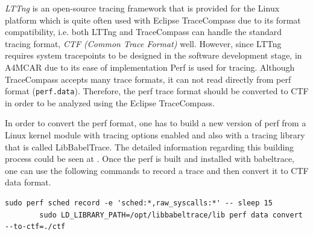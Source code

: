\begin{itemize}
	\textit{LTTng} \cite{lttng} is an open-source tracing framework that is provided for the Linux platform which is quite often used with Eclipse TraceCompass due to its format compatibility, i.e. both LTTng and TraceCompass can handle the standard tracing format, \textit{CTF (Common Trace Format)} well. However, since LTTng requires system tracepoints to be designed in the software development stage, in A4MCAR due to its ease of implementation Perf is used for tracing. Although TraceCompass accepts many trace formats, it can not read directly from perf format (\texttt{perf.data}). Therefore, the perf trace format should be converted to CTF in order to be analyzed using the Eclipse TraceCompass.
	
	In order to convert the perf format, one has to build a new version of perf from a Linux kernel module \cite{jolsa} with tracing options enabled and also with a tracing library that is called LibBabelTrace. The detailed information regarding this building process could be seen at \cite{perfbabeltrace}. Once the perf is built and installed with babeltrace, one can use the following commands to record a trace and then convert it to CTF data format. 
	\begin{lstlisting}[style=bash]
		sudo perf sched record -e 'sched:*,raw_syscalls:*' -- sleep 15
		sudo LD_LIBRARY_PATH=/opt/libbabeltrace/lib perf data convert --to-ctf=./ctf
	\end{lstlisting}
	

\end{itemize}

